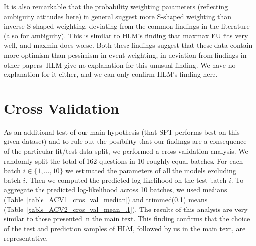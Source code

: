 \documentclass[11pt, a4paper, oneside,final,notitlepage,onecolumn]{article}\usepackage[]{graphicx}\usepackage[]{color}
\newcounter{sectio}
\begin{document}
It is also remarkable that the probability weighting parameters (reflecting ambiguity attitudes here) in general suggest more  S-shaped weighting than  inverse S-shaped weighting, deviating from the common findings in the literature (also for ambiguity).  This is similar to HLM's finding that maxmax EU fits very well, and maxmin does worse.  Both these findings suggest that these data contain more optimism than pessimism in event weighting, in deviation from findings in other papers.  HLM give no explanation for this unusual finding.  We have no explanation for it either, and we can only confirm HLM's finding here.

\section{Cross Validation}
\label{sec:cross-validation}

As an additional test of our main hypothesis (that SPT performs best on this given dataset) and to rule out the posibility that our findings are a consequence of the particular fit/test data split, we performed a cross-validation analysis. We randomly split the total of 162 questions in 10 roughly equal batches. For each batch $i\in\{1, \ldots, 10\}$ we estimated the parameters of all the models excluding batch $i$. Then we computed the predicted
 log-likelihood on the test batch $i$. To aggregate the predicted
 log-likelihood across 10 batches, we used medians (Table~\ref{table_ACV1_cros_val_median}) and trimmed(0.1) means (Table~\ref{table_ACV2_cros_val_mean_.1}). The results of this analysis are very similar to those presented in the main text.  This finding confirms that the choice of the test and prediction samples of HLM, followed by us in the main text, are representative.
\end{document}
